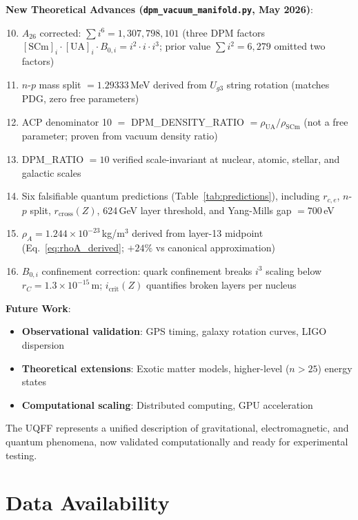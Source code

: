 \documentclass[12pt,a4paper]{article}
\begin{document}
\textbf{New Theoretical Advances (\texttt{dpm\_vacuum\_manifold.py}, May 2026)}:
\begin{enumerate}
    \setcounter{enumi}{9}
    \item $A_{26}$ corrected: $\sum i^6 = 1{,}307{,}798{,}101$ (three DPM factors $[\text{SCm}]_i \cdot [\text{UA}]_i \cdot B_{0,i} = i^2 \cdot i \cdot i^3$; prior value $\sum i^2 = 6{,}279$ omitted two factors)
    \item $n$-$p$ mass split $= 1.29333$\,MeV derived from $U_{g3}$ string rotation (matches PDG, zero free parameters)
    \item ACP denominator 10 $=$ DPM\_DENSITY\_RATIO $= \rho_{\mathrm{UA}}/\rho_{\mathrm{SCm}}$ (not a free parameter; proven from vacuum density ratio)
    \item DPM\_RATIO $= 10$ verified scale-invariant at nuclear, atomic, stellar, and galactic scales
    \item Six falsifiable quantum predictions (Table~\ref{tab:predictions}), including $r_{c,e}$, $n$-$p$ split, $r_{\mathrm{cross}}(Z)$, 624\,GeV layer threshold, and Yang-Mills gap $= 700$\,eV
    \item $\rho_A = 1.244 \times 10^{-23}$\,kg/m$^3$ derived from layer-13 midpoint (Eq.~\ref{eq:rhoA_derived}; $+24\%$ vs canonical approximation)
    \item $B_{0,i}$ confinement correction: quark confinement breaks $i^3$ scaling below $r_C = 1.3 \times 10^{-15}$\,m; $i_{\mathrm{crit}}(Z)$ quantifies broken layers per nucleus
\end{enumerate}

\textbf{Future Work}:
\begin{itemize}
    \item \textbf{Observational validation}: GPS timing, galaxy rotation curves, LIGO dispersion
    \item \textbf{Theoretical extensions}: Exotic matter models, higher-level ($n > 25$) energy states
    \item \textbf{Computational scaling}: Distributed computing, GPU acceleration
\end{itemize}

The UQFF represents a unified description of gravitational, electromagnetic, and quantum phenomena, now validated computationally and ready for experimental testing.

\section*{Data Availability}
\end{document}
